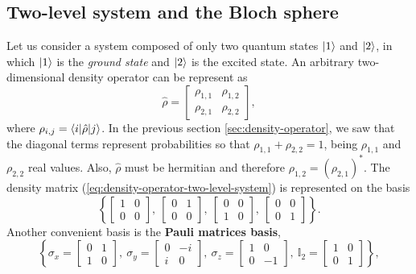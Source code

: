 %
\subsection{Two-level system and the Bloch sphere}
\label{sec:two-level-system-Bloch-sphere}
%

Let us consider a system composed of only two quantum states $ \ket{1} $ and $ \ket{2} $, in which $ \ket{1} $ is the \textit{ground state} and $ \ket{2} $ is the excited state. An arbitrary two-dimensional density operator can be represent as
\begin{equation}
	\hat{\rho} = \left[ \begin{matrix} \rho_{1, 1} & \rho_{1, 2} \\ \rho_{2, 1} & \rho_{2, 2}\end{matrix}\right],
	\label{eq:density-operator-two-level-system}
\end{equation}
where $ \rho_{i,j} = \braket{i|\hat{\rho}|j} $. In the previous section \ref{sec:density-operator}, we saw that the diagonal terms represent probabilities so that $ \rho_{1,1} + \rho_{2,2} = 1 $, being $\rho_{1,1} $ and $ \rho_{2,2} $ real values. Also, $ \hat{\rho} $ must be hermitian and therefore $ \rho_{1,2} = (\rho_{2,1})^* $. The density matrix (\ref{eq:density-operator-two-level-system}) is represented on the basis
\begin{equation}
	\left\{\left[ \begin{matrix} 1 & 0 \\ 0 & 0 \end{matrix} \right],\ \left[ \begin{matrix} 0 & 1 \\ 0 & 0 \end{matrix} \right],\ \left[ \begin{matrix} 0 & 0 \\ 1 & 0 \end{matrix} \right],\ \left[ \begin{matrix} 0 & 0 \\ 0 & 1 \end{matrix} \right] \right\}.
\end{equation}
Another convenient basis is the \textbf{Pauli matrices basis},
\begin{equation}
	\left\{\sigma_x = \left[ \begin{matrix} 0 & 1 \\ 1 & 0 \end{matrix} \right],\ \sigma_y = \left[ \begin{matrix} 0 & -i \\ i & 0 \end{matrix} \right],\ \sigma_z = \left[ \begin{matrix} 1 & 0 \\ 0 & -1 \end{matrix} \right],\ \mathbb{I}_2 = \left[ \begin{matrix} 1 & 0 \\ 0 & 1 \end{matrix} \right] \right\},
\end{equation}
